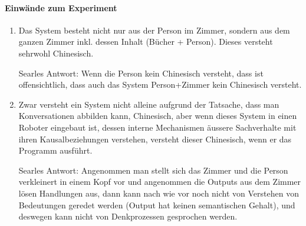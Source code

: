\documentclass[../main.tex]{subfiles}
\begin{document}
\paragraph{Einwände zum Experiment}
\begin{enumerate}
	\item Das System besteht nicht nur aus der Person im Zimmer, sondern aus dem ganzen Zimmer inkl. dessen Inhalt (Bücher + Person). Dieses versteht sehrwohl Chinesisch. 
		
		Searles Antwort: Wenn die Person kein Chinesisch versteht, dass ist offensichtlich, dass auch das System Person+Zimmer kein Chinesisch versteht. 
	\item Zwar versteht ein System nicht alleine aufgrund der Tatsache, dass man Konversationen abbilden kann, Chinesisch, aber wenn dieses System in einen Roboter eingebaut ist, dessen interne Mechanismen äussere Sachverhalte mit ihren Kausalbeziehungen verstehen, versteht dieser Chinesisch, wenn er das Programm ausführt. 
		
		Searles Antwort: Angenommen man stellt sich das Zimmer und die Person verkleinert in einem Kopf vor und angenommen die Outputs aus dem Zimmer lösen Handlungen aus, dann kann nach wie vor noch nicht von Verstehen von Bedeutungen geredet werden (Output hat keinen semantischen Gehalt), und deswegen kann nicht von Denkprozessen gesprochen werden. 
\end{enumerate}
\end{document}
